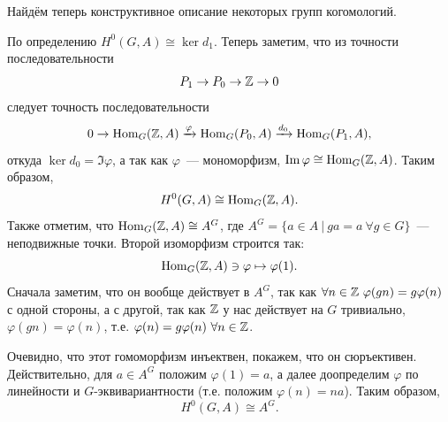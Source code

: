  	Найдём теперь конструктивное описание некоторых групп когомологий. 

 	\begin{example}
 		По определению $H^{0}(G, A) \cong \ker{d_1}$. Теперь заметим, что из точности последовательности 
 		\[
 			P_1 \to P_0 \to \mathbb{Z} \to 0
 		\]
 		следует точность последовательности 
 		\[
 			0 \to \operatorname{Hom}_{G}(\mathbb{Z}, A) \xrightarrow{\varphi} \operatorname{Hom}_{G}(P_0, A) \xrightarrow{d_0} \operatorname{Hom}_{G}(P_1, A),
 		\]
 		откуда $\ker{d_0} = \Im{\varphi}$, а так как $\varphi$~--- мономорфизм, $\mathop{\mathrm{Im}}\nolimits{\varphi} \cong \operatorname{Hom}_{G}(\mathbb{Z}, A)$. Таким образом, 
 		\[
 			H^{0}(G, A) \cong \operatorname{Hom}_{G}(\mathbb{Z}, A).
 		\]
 		Также отметим, что $\operatorname{Hom}_{G}(\mathbb{Z}, A) \cong A^{G}$, где $A^G = \{ a \in A \ \vert \ ga = a \ \forall g \in G \}$~--- неподвижные точки. Второй изоморфизм строится так: 
 		\[
 			\operatorname{Hom}_{G}(\mathbb{Z}, A) \ni \varphi  \mapsto \varphi(1).
 		\]
 		Сначала заметим, что он вообще действует в $A^{G}$, так как $\forall n \in \mathbb{Z} \ \varphi(gn) = g\varphi(n)$ с одной стороны, а с другой, так как $\mathbb{Z}$ у нас действует на $G$ тривиально, $\varphi(gn) = \varphi(n)$, т.е. $\varphi(n) = g \varphi(n) \ \forall n \in \mathbb{Z}$.

 		Очевидно, что этот гомоморфизм инъектвен, покажем, что он сюръективен. Действительно, для $a \in A^G$ положим $\varphi(1) = a$, а далее доопределим $\varphi$ по линейности и $G$-эквивариантности (т.е. положим $\varphi(n) = na$). Таким образом, 
 		\[
 		 	H^{0}(G, A) \cong A^{G}.
 		 \] 
 		
 	\end{example}


